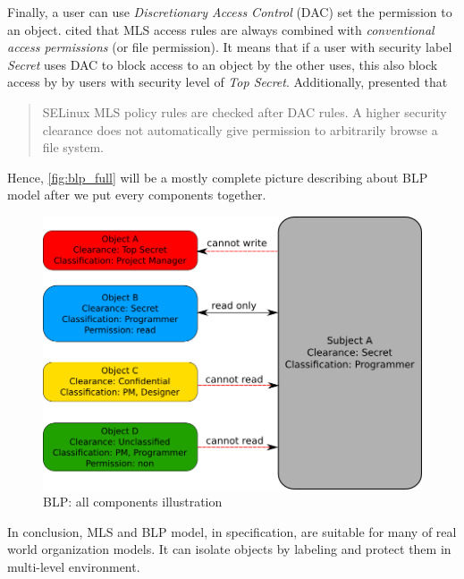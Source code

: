 Finally, a user can use \emph{Discretionary Access Control} (DAC) set the permission to an object.
\cite{centos:2008} cited that MLS access rules are always combined with \emph{conventional access permissions} (or file permission).
It means that if a user with security label \emph{Secret} uses DAC to block access to an object by the other uses, this also block access by by users with security level of \emph{Top Secret}.
Additionally, \cite{bancinco:2015} presented that
\begin{quote}
SELinux MLS policy rules are checked after DAC rules. A higher security clearance does not automatically give permission to arbitrarily browse a file system.
\end{quote}
Hence, \autoref{fig:blp_full} will be a mostly complete picture describing about BLP model after we put every components together.

\begin{figure}[bth]
\myfloatalign
\includegraphics[width=1.0\linewidth]{gfx/chapter_2/blp_example}
\caption[BLP: all components illustration]{BLP: all components illustration}
\label{fig:blp_full}
\end{figure}

In conclusion, MLS and BLP model, in specification, are suitable for many of real world organization models.
It can isolate objects by labeling and protect them in multi-level environment.
